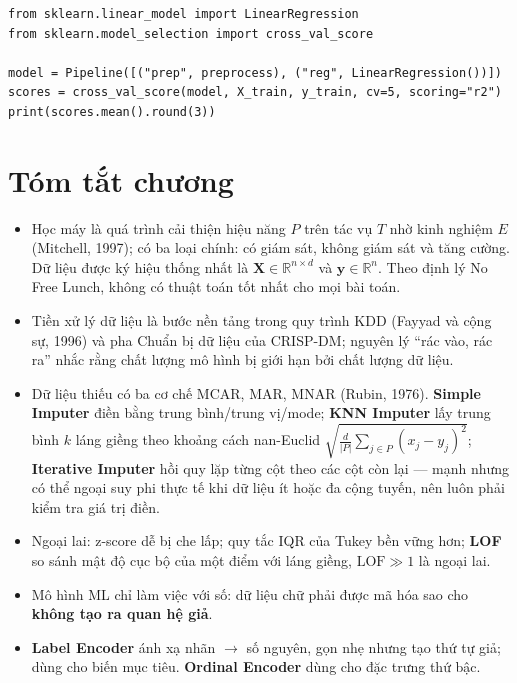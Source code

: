 \begin{lstlisting}[caption={Ghép tiền xử lý với mô hình trong một Pipeline}]
from sklearn.linear_model import LinearRegression
from sklearn.model_selection import cross_val_score

model = Pipeline([("prep", preprocess), ("reg", LinearRegression())])
scores = cross_val_score(model, X_train, y_train, cv=5, scoring="r2")
print(scores.mean().round(3))
\end{lstlisting}

\section{Tóm tắt chương}
\begin{itemize}
    \item Học máy là quá trình cải thiện hiệu năng $P$ trên tác vụ $T$ nhờ kinh nghiệm $E$ (Mitchell, 1997); có ba loại chính: có giám sát, không giám sát và tăng cường. Dữ liệu được ký hiệu thống nhất là $\mathbf{X} \in \mathbb{R}^{n \times d}$ và $\mathbf{y} \in \mathbb{R}^{n}$. Theo định lý No Free Lunch, không có thuật toán tốt nhất cho mọi bài toán.
    \item Tiền xử lý dữ liệu là bước nền tảng trong quy trình KDD (Fayyad và cộng sự, 1996) và pha Chuẩn bị dữ liệu của CRISP-DM; nguyên lý ``rác vào, rác ra'' nhắc rằng chất lượng mô hình bị giới hạn bởi chất lượng dữ liệu.
    \item Dữ liệu thiếu có ba cơ chế MCAR, MAR, MNAR (Rubin, 1976). \textbf{Simple Imputer} điền bằng trung bình/trung vị/mode; \textbf{KNN Imputer} lấy trung bình $k$ láng giềng theo khoảng cách nan-Euclid $\sqrt{\frac{d}{|P|}\sum_{j \in P}(x_j - y_j)^2}$; \textbf{Iterative Imputer} hồi quy lặp từng cột theo các cột còn lại --- mạnh nhưng có thể ngoại suy phi thực tế khi dữ liệu ít hoặc đa cộng tuyến, nên luôn phải kiểm tra giá trị điền.
    \item Ngoại lai: z-score dễ bị che lấp; quy tắc IQR của Tukey bền vững hơn; \textbf{LOF} so sánh mật độ cục bộ của một điểm với láng giềng, $\text{LOF} \gg 1$ là ngoại lai.
    \item Mô hình ML chỉ làm việc với số: dữ liệu chữ phải được mã hóa sao cho \textbf{không tạo ra quan hệ giả}.
    \item \textbf{Label Encoder} ánh xạ nhãn $\rightarrow$ số nguyên, gọn nhẹ nhưng tạo thứ tự giả; dùng cho biến mục tiêu. \textbf{Ordinal Encoder} dùng cho đặc trưng thứ bậc.

\end{itemize}

